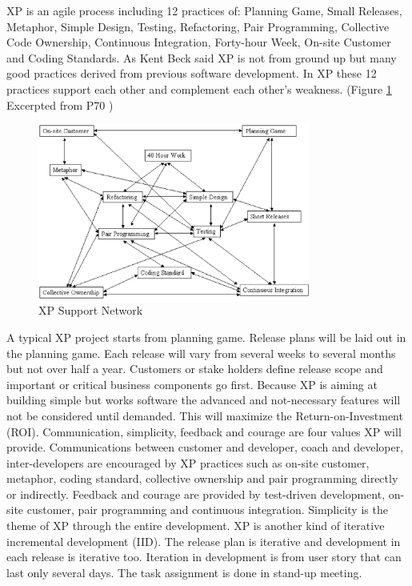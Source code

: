 XP is an agile process including 12 practices of: Planning Game, Small
Releases, Metaphor, Simple Design, Testing, Refactoring, Pair Programming,
Collective Code Ownership, Continuous Integration, Forty-hour Week,
On-site Customer and Coding Standards. \cite{Beck:00} As Kent Beck said XP is
not from ground up but many good practices derived from previous software
development. In XP these 12 practices support each other and complement
each other's weakness.  (Figure \ref{fig:XPSupportNetwork} Excerpted from
P70 \cite{Beck:00})
\begin{figure}[ht] 
  \centering
  \includegraphics[width=0.8\textwidth]{figs/XPSupportNetwork.eps}
  \caption{XP Support Network}\label{fig:XPSupportNetwork}
\end{figure} 

A typical XP project starts from planning game. Release plans will be laid
out in the planning game. Each release will vary from several weeks to
several months but not over half a year. Customers or stake holders define
release scope and important or critical business components go first.
Because XP is aiming at building simple but works software the advanced and
not-necessary features will not be considered until demanded. This will
maximize the Return-on-Investment (ROI). Communication, simplicity,
feedback and courage are four values XP will provide. Communications between
customer and developer, coach and developer, inter-developers are
encouraged by XP practices such as on-site customer, metaphor, coding
standard, collective ownership and pair programming directly or indirectly.
Feedback and courage are provided by test-driven development, on-site
customer, pair programming and continuous integration.  Simplicity is the
theme of XP through the entire development.  XP is another kind of
iterative incremental development (IID). The release plan is iterative and
development in each release is iterative too. Iteration in development is
from user story that can last only several days. The task assignment is
done in stand-up meeting. \cite{Beck:00}

